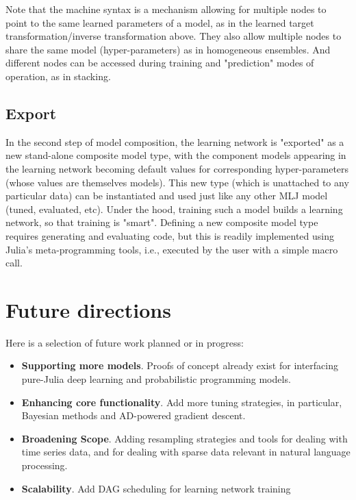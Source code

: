 \documentclass{article}
\begin{document}
Note that the machine syntax is a mechanism allowing for multiple nodes to point to the same learned parameters of a model, as in the learned target transformation/inverse transformation above. They also allow multiple nodes to share the same model (hyper-parameters) as in homogeneous ensembles. And different nodes can be accessed during training and "prediction" modes of operation, as in stacking.

\subsection{Export}

In the second step of model composition, the learning network is "exported" as a new stand-alone composite model type, with the component models appearing in the learning network becoming default values for corresponding hyper-parameters (whose values are themselves models). This new type (which is unattached to any particular data) can be instantiated and used just like any other MLJ model (tuned, evaluated, etc). Under the hood, training such a model builds a learning network, so that training is "smart". Defining a new composite model type requires generating and evaluating code, but this is readily implemented using Julia's meta-programming tools, i.e., executed by the user with a simple macro call.

\section{Future directions}

Here is a selection of future work planned or in progress:

\begin{itemize}
    \item \textbf{Supporting more models}. Proofs of concept already exist for interfacing pure-Julia deep learning and probabilistic programming models.
    \item \textbf{Enhancing core functionality}. Add more tuning strategies, in particular, Bayesian methods and AD-powered gradient descent.
   \item \textbf{Broadening Scope}. Adding resampling strategies and tools for dealing with time series data, and for dealing with sparse data relevant in natural language processing.
   \item \textbf{Scalability}. Add DAG scheduling for learning network training
\end{itemize}
\end{document}
